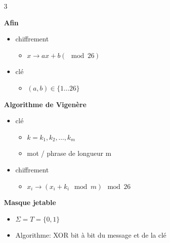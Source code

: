 \documentclass[9pt, a4paper, twoside]{article}
\begin{document}
\begin{multicols}{3}

\begin{flushleft}
    \scriptsize \textbf{Afin}
\end{flushleft}

\begin{itemize}[label=$\bullet$]
    \item \scriptsize chiffrement
    \begin{itemize}[label={}]
        \item \scriptsize $x \rightarrow ax + b (\mod 26)$
    \end{itemize}
    \item \scriptsize clé
    \begin{itemize}[label={}]
        \item \scriptsize $(a,b) \in \{1 \ldots 26\}$
    \end{itemize}
\end{itemize}


\begin{flushleft}
    \scriptsize \textbf{Algorithme de Vigenère}
\end{flushleft}

\begin{itemize}[label=$\bullet$]
    \item \scriptsize clé
    \begin{itemize}[label={}]
        \item \scriptsize $k = k_{1}, k_{2}, \ldots, k_{m}$
        \item \scriptsize mot / phrase de longueur m
    \end{itemize}
    \item \scriptsize chiffrement
    \begin{itemize}[label={}]
        \item \scriptsize $x_{i} \rightarrow (x_{i} + k_{i} \mod m) \mod 26$
    \end{itemize}
\end{itemize}


\begin{flushleft}
    \scriptsize \textbf{Masque jetable}
\end{flushleft}

\begin{itemize}[label=$\bullet$]
    \item \scriptsize $\Sigma = T = \{0, 1\}$
    \item \scriptsize Algorithme: XOR bit à bit du message et de la clé
\end{itemize}


\end{multicols}
\end{document}
